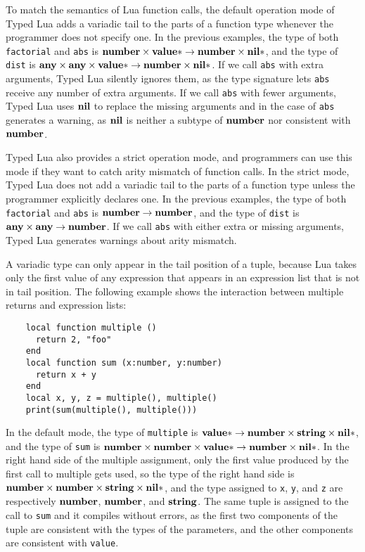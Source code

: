 To match the semantics of Lua function calls, the default operation
mode of Typed Lua adds a variadic tail to the parts of a function
type whenever the programmer does not specify one.
In the previous examples, the type of both \texttt{factorial} and
\texttt{abs} is
$\mathbf{number} \times \mathbf{value}{*} \rightarrow \mathbf{number} \times \mathbf{nil}{*}$,
and the type of \texttt{dist} is
$\mathbf{any} \times \mathbf{any} \times \mathbf{value}{*} \rightarrow \mathbf{number} \times \mathbf{nil}{*}$.
If we call \texttt{abs} with extra arguments, Typed Lua silently ignores
them, as the type signature lets \texttt{abs} receive any number of
extra arguments.
If we call \texttt{abs} with fewer arguments, Typed Lua uses $\mathbf{nil}$ to
replace the missing arguments and in the case of \texttt{abs} generates
a warning, as $\mathbf{nil}$ is neither a subtype of $\mathbf{number}$ nor consistent
with $\mathbf{number}$.

Typed Lua also provides a strict operation mode, and programmers can
use this mode if they want to catch arity mismatch of function calls.
In the strict mode, Typed Lua does not add a variadic tail to the
parts of a function type unless the programmer explicitly declares one.
In the previous examples, the type of both \texttt{factorial} and
\texttt{abs} is $\mathbf{number} \rightarrow \mathbf{number}$, and the type of
\texttt{dist} is $\mathbf{any} \times \mathbf{any} \rightarrow \mathbf{number}$.
If we call \texttt{abs} with either extra or missing arguments,
Typed Lua generates warnings about arity mismatch.

A variadic type can only appear in the tail position of a tuple,
because Lua takes only the first value of any expression that appears
in an expression list that is not in tail position.
The following example shows the interaction between multiple returns
and expression lists:
\begin{verbatim}
    local function multiple ()
      return 2, "foo"
    end
    local function sum (x:number, y:number)
      return x + y
    end
    local x, y, z = multiple(), multiple()
    print(sum(multiple(), multiple()))
\end{verbatim}

In the default mode, the type of \texttt{multiple} is
$\mathbf{value}{*} \rightarrow \mathbf{number} \times \mathbf{string} \times \mathbf{nil}{*}$,
and the type of \texttt{sum} is
$\mathbf{number} \times \mathbf{number} \times \mathbf{value}{*} \rightarrow \mathbf{number} \times \mathbf{nil}{*}$.
In the right hand side of the multiple assignment, only the first
value produced by the first call to multiple gets used,
so the type of the right hand side is
$\mathbf{number} \times \mathbf{number} \times \mathbf{string} \times \mathbf{nil}{*}$,
and the type assigned to \texttt{x}, \texttt{y}, and \texttt{z}
are respectively $\mathbf{number}$, $\mathbf{number}$, and $\mathbf{string}$.
The same tuple is assigned to the call to \texttt{sum} and it
compiles without errors, as the first two components of the tuple
are consistent with the types of the parameters, and the other
components are consistent with \texttt{value}.

